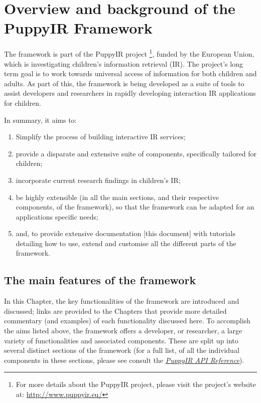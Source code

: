 \documentclass[letterpaper,10pt,english]{sphinxmanual}
\begin{document}
\section{Overview and background of the PuppyIR Framework}
\label{overview:overview}\label{overview::doc}\label{overview:overview-and-background-of-the-puppyir-framework}
The framework is part of the PuppyIR project \footnote{
For more details about the PuppyIR project, please visit the project's website at: \href{http://www.puppyir.eu/}{http://www.puppyir.eu/}
}, funded by the European Union, which is investigating children's information retrieval (IR). The project's long term goal is to work towards universal access of information for both children and adults. As part of this, the framework is being developed as a suite of tools to assist developers and researchers in rapidly developing interaction IR applications for children.

In summary, it aims to:
\begin{enumerate}
\item {} 
Simplify the process of building interactive IR services;

\item {} 
provide a disparate and extensive suite of components, specifically tailored for children;

\item {} 
incorporate current research findings in children's IR;

\item {} 
be highly extensible (in all the main sections, and their respective components, of the framework), so that the framework can be adapted for an applications specific needs;

\item {} 
and, to provide extensive documentation {[}this document{]} with tutorials detailing how to use, extend and customise all the different parts of the framework.

\end{enumerate}


\subsection{The main features of the framework}
\label{overview:the-main-features-of-the-framework}
In this Chapter, the key functionalities of the framework are introduced and discussed; links are provided to the Chapters that provide more detailed commentary (and examples) of each functionality discussed here. To accomplish the aims listed above, the framework offers a developer, or researcher, a large variety of functionalities and associated components. These are split up into several distinct sections of the framework (for a full list, of all the individual components in these sections, please see consult the {\hyperref[api2.0:api]{\emph{PuppyIR API Reference}}}).
\end{document}
